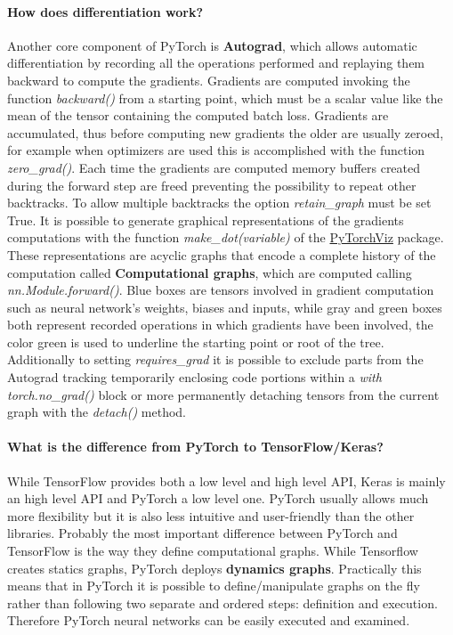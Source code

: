 \documentclass[11pt, a4paper, hidelinks]{report}
\begin{document}
\paragraph{How does differentiation work?}\label{par:what-is-autograd}
Another core component of PyTorch is \textbf{Autograd}, which allows automatic differentiation by recording all the operations performed and replaying them backward to compute the gradients.
Gradients are computed invoking the function \textit{backward()} from a starting point, which must be a scalar value like the mean of the tensor containing the computed batch loss.
Gradients are accumulated, thus before computing new gradients the older are usually zeroed, for example when optimizers are used this is accomplished with the function \textit{zero\_grad()}.
Each time the gradients are computed memory buffers created during the forward step are freed preventing the possibility to repeat other backtracks.
To allow multiple backtracks the option \textit{retain\_graph} must be set True.
It is possible to generate graphical representations of the gradients computations with the function \textit{make\_dot(variable)} of the \href{https://github.com/szagoruyko/pytorchviz}{PyTorchViz} package.
These representations are acyclic graphs that encode a complete history of the computation called \textbf{Computational graphs}, which are computed calling \textit{nn.Module.forward()}.
Blue boxes are tensors involved in gradient computation such as neural network's weights, biases and inputs, while gray and green boxes both represent recorded operations in which gradients have been involved, the color green is used to underline the starting point or root of the tree.
Additionally to setting \textit{requires\_grad} it is possible to exclude parts from the Autograd tracking temporarily enclosing code portions within a \textit{with torch.no\_grad()} block or more permanently detaching tensors from the current graph with the \textit{detach()} method.

\paragraph{What is the difference from PyTorch to TensorFlow/Keras?}\label{par:what-is-the-difference-from-pytorch-to-tensorflow/keras?}
While TensorFlow provides both a low level and high level API, Keras is mainly an high level API and PyTorch a low level one.
PyTorch usually allows much more flexibility but it is also less intuitive and user-friendly than the other libraries.
Probably the most important difference between PyTorch and TensorFlow is the way they define computational graphs.
While Tensorflow creates statics graphs, PyTorch deploys \textbf{dynamics graphs}.
Practically this means that in PyTorch it is possible to define/manipulate graphs on the fly rather than following two separate and ordered steps: definition and execution.
Therefore PyTorch neural networks can be easily executed and examined.
\end{document}
